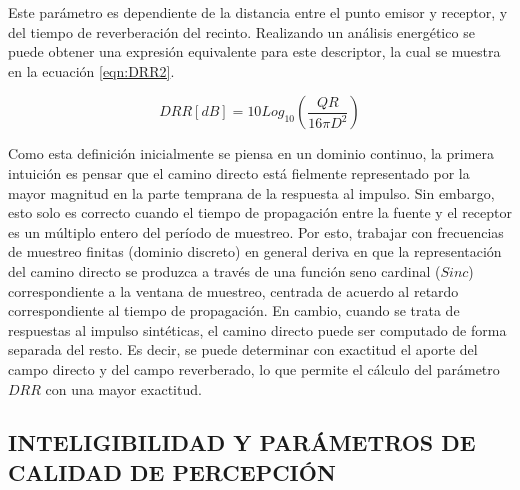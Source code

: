 Este parámetro es dependiente de la distancia entre el punto emisor y receptor, y del tiempo de reverberación del recinto. Realizando un análisis energético \cite{libro_dereverb} se puede obtener una expresión equivalente para este descriptor, la cual se muestra en la ecuación \ref{eqn:DRR2}.

\begin{equation}
\label{eqn:DRR2}
	DRR [dB]= 10 Log_{10}(\frac{QR}{16 \pi D^{2}}) 
\end{equation}



Como esta definición inicialmente se piensa en un dominio continuo, la primera intuición es pensar que el camino directo está fielmente representado por la mayor magnitud en la parte temprana de la respuesta al impulso. Sin embargo, esto solo es correcto cuando el tiempo de propagación entre la fuente y el receptor es un múltiplo entero del período de muestreo. Por esto, trabajar con frecuencias de muestreo finitas (dominio discreto) en general deriva en que la representación del camino directo se produzca a través de una función seno cardinal ($Sinc$) correspondiente a la ventana de muestreo, centrada de acuerdo al retardo correspondiente al tiempo de propagación. En cambio, cuando se trata de respuestas al impulso sintéticas, el camino directo puede ser computado de forma separada del resto. Es decir, se puede determinar con exactitud el aporte del campo directo y del campo reverberado, lo que permite el cálculo del parámetro $DRR$ con una mayor exactitud. 




\subsection[Inteligibilidad y parámetros de calidad de percepción]{INTELIGIBILIDAD Y PARÁMETROS DE CALIDAD DE PERCEPCIÓN}

